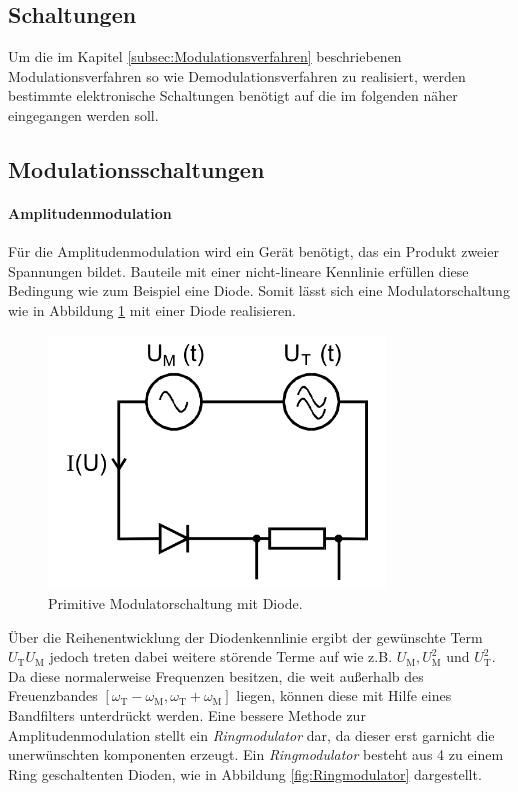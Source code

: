 \FloatBarrier

\subsection{Schaltungen}
\label{subsec:Schaltungen}
Um die im Kapitel \ref{subsec:Modulationsverfahren}
beschriebenen Modulationsverfahren so wie Demodulationsverfahren zu realisiert, werden
bestimmte elektronische Schaltungen
benötigt auf die im folgenden näher eingegangen werden soll.

\subsection{Modulationsschaltungen}
\label{subsubsec:Modulationsschaltungen}
\paragraph{Amplitudenmodulation}
Für die Amplitudenmodulation
wird ein Gerät benötigt, das ein
Produkt zweier Spannungen bildet.
Bauteile mit einer nicht-lineare Kennlinie
erfüllen diese Bedingung wie zum Beispiel eine
Diode.
Somit lässt sich eine Modulatorschaltung
wie in Abbildung \ref{fig:diode}
mit einer Diode realisieren.
\begin{figure}
  \centering
  \includegraphics[width=0.8\textwidth]{figures/diode.PNG}
  \caption{Primitive Modulatorschaltung mit Diode.}
  \label{fig:diode}
\end{figure}
Über die Reihenentwicklung der
Diodenkennlinie ergibt der gewünschte
Term $U_{\text{T}}U_{\text{M}}$ jedoch
treten dabei weitere störende Terme
auf wie z.B. $U_{\text{M}}, U_{\text{M}}^2$ und $U_{\text{T}}^2$.
Da diese normalerweise Frequenzen
besitzen, die weit außerhalb des
Freuenzbandes $[\omega_{\text{T}}-\omega_{\text{M}},\omega_{\text{T}}+\omega_{\text{M}}]$ liegen,
können diese mit Hilfe eines Bandfilters unterdrückt werden.
Eine bessere Methode zur Amplitudenmodulation
stellt ein
\textit{Ringmodulator} dar, da dieser
erst garnicht die unerwünschten komponenten
erzeugt.
Ein \textit{Ringmodulator} besteht aus
4 zu einem Ring geschaltenten Dioden,
wie in Abbildung
\ref{fig:Ringmodulator} dargestellt.


